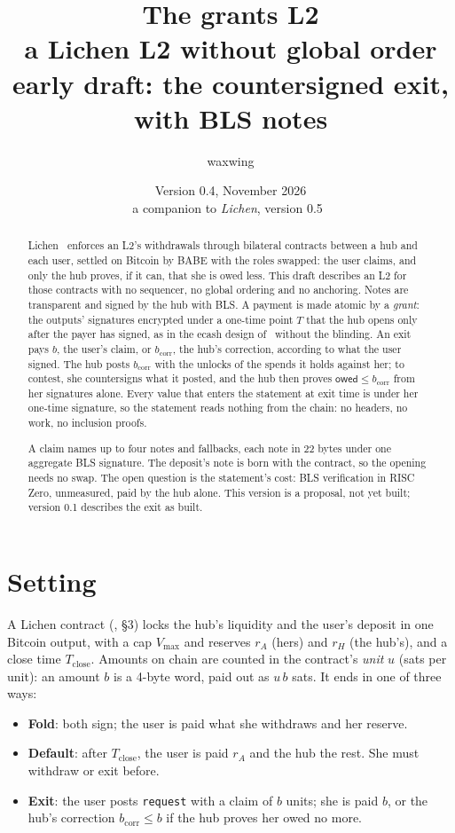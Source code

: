 \documentclass[11pt]{article}
\title{\textbf{The grants L2}\\a Lichen L2 without global order\\[2pt]\large early draft: the countersigned exit, with BLS notes}
\author{waxwing}
\date{Version 0.4, November 2026\\[2pt]\small a companion to \emph{Lichen}, version 0.5~\cite{lichen}}
\theoremstyle{plain}
\theoremstyle{definition}
\newcommand{\vmax}{V_{\max}}
\newcommand{\Tc}{T_{\mathrm{close}}}
\newcommand{\bcorr}{b_{\mathrm{corr}}}
\newcommand{\tx}[1]{\texttt{#1}}
\newcommand{\owed}{\mathsf{owed}}
\begin{document}
\maketitle

\begin{abstract}
Lichen~\cite{lichen} enforces an L2's withdrawals through bilateral
contracts between a hub and each user, settled on Bitcoin by BABE with
the roles swapped: the user claims, and only the hub proves, if it can,
that she is owed less. This draft describes an L2 for those contracts
with no sequencer, no global ordering and no anchoring. Notes are
transparent and signed by the hub with BLS. A payment is made atomic
by a \emph{grant}: the outputs' signatures encrypted under a one-time
point $T$ that the hub opens only after the payer has signed, as in
the ecash design of~\cite{ecash} without the blinding. An exit pays
$b$, the user's claim, or $\bcorr$, the hub's correction, according to
what the user signed. The hub posts $\bcorr$ with the unlocks of the
spends it holds against her; to contest, she countersigns what it
posted, and the hub then proves $\owed \le \bcorr$ from her signatures
alone. Every value that enters the statement at exit time is under her
one-time signature, so the statement reads nothing from the chain: no
headers, no work, no inclusion proofs.

A claim names up to four notes and fallbacks, each note in 22 bytes
under one aggregate BLS signature. The deposit's note is born with the
contract, so the opening needs no swap. The open question is the
statement's cost: BLS verification in RISC Zero, unmeasured, paid by
the hub alone. This version is a proposal, not yet built; version 0.1
describes the exit as built.
\end{abstract}

\tableofcontents

\section{Setting}

A Lichen contract (\cite{lichen}, \S3) locks the hub's liquidity and the
user's deposit in one Bitcoin output, with a cap $\vmax$ and reserves
$r_A$ (hers) and $r_H$ (the hub's), and a close time $\Tc$. Amounts on
chain are counted in the contract's \emph{unit} $u$ (sats per unit): an
amount $b$ is a 4-byte word, paid out as $u\,b$ sats. It ends in one of
three ways:
\begin{itemize}[nosep]
\item \textbf{Fold}: both sign; the user is paid what she withdraws and
  her reserve.
\item \textbf{Default}: after $\Tc$, the user is paid $r_A$ and the hub
  the rest. She must withdraw or exit before.
\item \textbf{Exit}: the user posts \tx{request} with a claim of $b$
  units; she is paid $b$, or the hub's correction $\bcorr \le b$ if the
  hub proves her owed no more.
\end{itemize}
\end{document}
